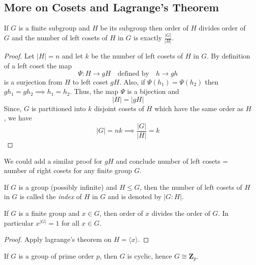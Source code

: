 \subsection{More on Cosets and Lagrange's Theorem}

\begin{theorem}
    If $G$ is a finite subgroup and $H$ be its subgroup then order of $H$ divides order of $G$ and the number of left cosets of $H$ in $G$
    is exactly $\frac{|G|}{|H|}$.  
\end{theorem}

\begin{proof}
    Let $|H|=n$ and let $k$ be the number of left cosets of $H$ in $G$. By definition of a left coset the map
    \[ \Psi : H \to gH \quad \text{defined by} \quad h \to gh \] 
    is a surjection from $H$ to left coset  $gH$. Also, if $\Psi(h_1)=\Psi(h_2)$ then $gh_1 = gh_2 \implies h_1=h_2$. Thus,
    the map $\Psi$ is a bijection and 
    \[ |H|=|gH| \]
    Since, $G$ is partitioned into $k$ disjoint cosets of $H$ which have the same order as $H$, we have 
    \[ |G|=nk \implies \frac{|G|}{|H|}=k \] 
\end{proof}

\begin{remark}
    We could add a similar proof for $gH$ and conclude number of left cosets = number of right cosets for any finite group $G$.
\end{remark}

\begin{definition}
    If $G$ is a group (possibly infinite) and $H \le G$, then the number of left cosets of $H$ in $G$ is called the \textit{index} of $H$
    in $G$ and is denoted by $|G:H|$.
\end{definition}

\begin{proposition}
    If $G$ is a finite group and $x \in G$, then order of $x$ divides the order of $G$. In particular $x^{|G|}=1$ for all $x \in G$.
\end{proposition}

\begin{proof}
    Apply lagrange's theorem on $H=\langle x \rangle$.
\end{proof}

\begin{proposition}
    If $G$ is a group of prime order $p$, then $G$ is cyclic, hence $G \cong \mathbf{Z}_{p}$.
\end{proposition}

